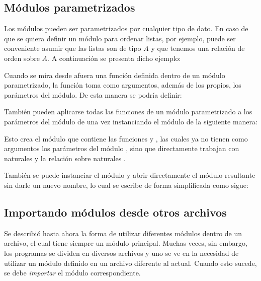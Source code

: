 
\subsection{Módulos parametrizados}\label{modules:parametrized}

Los módulos pueden ser parametrizados por cualquier tipo de dato. En caso de que se quiera definir un módulo para ordenar listas, por ejemplo, puede ser conveniente asumir que las listas son de tipo $A$ y que tenemos una relación de orden sobre $A$. A continuación se presenta dicho ejemplo: 




Cuando se mira desde afuera una función definida dentro de un módulo parametrizado, la función toma como argumentos, además de los propios, los parámetros del módulo. De esta manera se podría definir:




También pueden aplicarse todas las funciones de un módulo parametrizado a los parámetros del módulo de una vez instanciando el módulo de la siguiente manera: 




Esto crea el módulo  que contiene las funciones  y , las cuales ya no tienen como argumentos los parámetros del módulo , sino que directamente trabajan con naturales y la relación sobre naturales \AgdaFunction{<}. 




También se puede instanciar el módulo y abrir directamente el módulo resultante sin darle un nuevo nombre, lo cual se escribe de forma simplificada como sigue:




\subsection{Importando módulos desde otros archivos}\label{modules:files}

Se describió hasta ahora la forma de utilizar diferentes módulos dentro de un archivo, el cual tiene siempre un módulo principal. Muchas veces, sin embargo, los programas se dividen en diversos archivos y uno se ve en la necesidad de utilizar un módulo definido en un archivo diferente al actual. Cuando esto sucede, se debe \textit{importar} el módulo correspondiente.  

